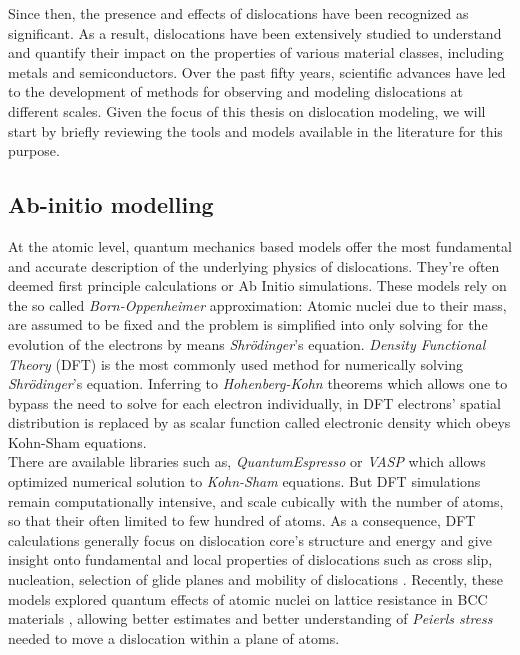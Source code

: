 \documentclass{article}
\begin{document}
Since then, the presence and effects of dislocations have been recognized as significant. As a result, dislocations have been extensively studied to understand and quantify their impact on the properties of various material classes, including metals and semiconductors. Over the past fifty years, scientific advances have led to the development of methods for observing and modeling dislocations at different scales. Given the focus of this thesis on dislocation modeling, we will start by briefly reviewing the tools and models available in the literature for this purpose.
\subsection{Ab-initio modelling}
At the atomic level, quantum mechanics based models offer the most fundamental and accurate description of the underlying physics of dislocations. They're often deemed first principle calculations or Ab Initio simulations. These models rely on the so called \emph{Born-Oppenheimer} approximation: Atomic nuclei due to their mass, are assumed to be fixed and the problem is simplified into only solving for the evolution of the electrons by means \emph{Shrödinger}'s equation. \emph{Density Functional Theory} (DFT) is the most commonly used method for numerically solving \emph{Shrödinger}'s equation. Inferring to \emph{Hohenberg-Kohn} theorems \parencite{engelDensityFunctional2011} which allows one to bypass the need to solve for each electron individually, in DFT electrons' spatial distribution is replaced by as scalar function called electronic density which obeys Kohn-Sham equations.\\
There are available libraries such as, \emph{QuantumEspresso} or \emph{VASP} which allows optimized numerical solution to \emph{Kohn-Sham} equations. But DFT simulations remain computationally intensive, and scale cubically with the number of atoms, so that their often limited to few hundred of atoms. As a consequence, DFT calculations generally focus on dislocation core's structure \parencite{woodwardPredictionDislocation2008} and energy and give insight onto fundamental and local properties of dislocations such as cross slip, nucleation, selection of glide planes and mobility of dislocations \parencite{rodneyinitiomodeling2017}. Recently, these models explored quantum effects of atomic nuclei on lattice resistance in BCC materials \parencite{provilleQuantumeffect2012}, allowing better estimates and better understanding of \emph{Peierls stress} needed to move a dislocation within a plane of atoms. \\
\end{document}
